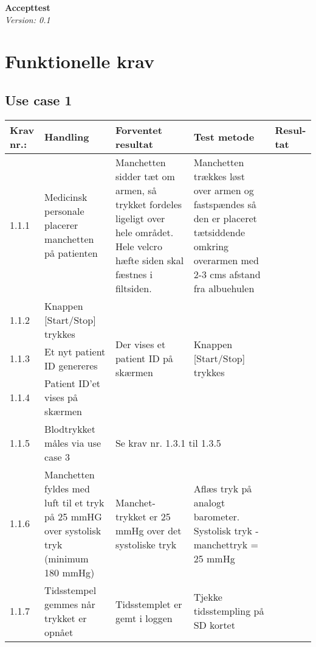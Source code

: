 \documentclass[11pt]{article}
\begin{document}
	\begin{titlepage}
		\begin{center}
			\Large\textbf{Accepttest}\\
			\large\textit{Version: 0.1}
		\end{center}
	\end{titlepage}
	
	\tableofcontents
	\newpage
	
	\section{Funktionelle krav}
	\subsection{Use case 1}
		\begin{center}
			\begin{longtable}{|p{1.5cm}|p{2cm}|p{3cm}|p{3cm}|p{1.1cm}|}
			\hline
			Krav nr.: & Handling & Forventet resultat & Test metode & Resul-tat  \\\hline
		    1.1.1& Medicinsk personale placerer manchetten på patienten & Manchetten sidder tæt om armen, så trykket fordeles ligeligt over hele området. Hele velcro hæfte siden skal fæstnes i filtsiden. & Manchetten trækkes løst over armen og fastspændes så den er placeret tætsiddende omkring overarmen med 2-3 cms afstand fra albuehulen  &   \\\hline
			1.1.2& Knappen [Start/Stop] trykkes & \multirow{3}{3cm}{Der vises et patient ID på skærmen} &\multirow{3}{3cm}{Knappen [Start/Stop] trykkes}  & \multirow{3}{3cm}{}  \\ \cline{1-2}
			1.1.3& Et nyt patient ID genereres & &  &  \\ \cline{1-2}
			1.1.4& Patient ID’et vises på skærmen & &  &   \\ \hline
			1.1.5& Blodtrykket måles via use case 3 & \multicolumn{3}{l|}{Se krav nr. 1.3.1 til 1.3.5} \\ \hline
			1.1.6& Manchetten fyldes med luft til et tryk på 25 mmHG over systolisk tryk (minimum 180 mmHg) & Manchet-trykket er 25 mmHg over det systoliske tryk & Aflæs tryk på analogt barometer. Systolisk tryk - manchettryk = 25 mmHg &  \\ \hline
			1.1.7& Tidsstempel gemmes når trykket er opnået & Tidsstemplet er gemt i loggen & Tjekke tidsstempling på SD kortet &   \\ \hline
		

\end{longtable}
\end{center}
\end{document}

